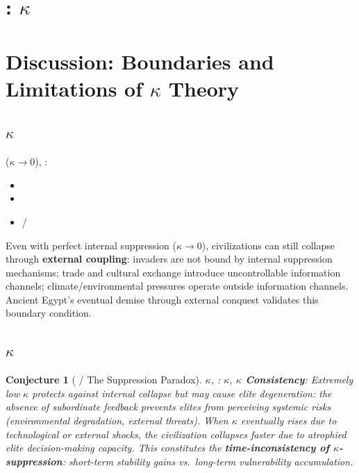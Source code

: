 \documentclass[11pt,a4paper]{article}
\newtheorem{conjecture}[theorem]{Conjecture}
\theoremstyle{definition}
\newcommand{\coupling}{\kappa}
\begin{document}
\section{: $\coupling$}
\section{Discussion: Boundaries and Limitations of $\coupling$ Theory}
\subsection{$\coupling$}
($\coupling \to 0$), : 
\begin{itemize}
 \item 
 \item 
 \item /
\end{itemize}
Even with perfect internal suppression ($\coupling \to 0$), civilizations can still
collapse through \textbf{external coupling}: invaders are not bound by internal suppression
mechanisms; trade and cultural exchange introduce uncontrollable information channels;
climate/environmental pressures operate outside information channels. Ancient Egypt's
eventual demise through external conquest validates this boundary condition.
\subsection{$\coupling$}
\begin{conjecture}[ / The Suppression Paradox]
\label{conj:paradox}
 $\coupling$, : 
 $\coupling$, 
 \textbf{$\coupling$ Consistency}: 
Extremely low $\coupling$ protects against internal collapse but may cause elite
degeneration: the absence of subordinate feedback prevents elites from perceiving
systemic risks (environmental degradation, external threats). When $\coupling$
eventually rises due to technological or external shocks, the civilization collapses
faster due to atrophied elite decision-making capacity. This constitutes the
\textbf{time-inconsistency of $\coupling$-suppression}: short-term stability gains
vs.\ long-term vulnerability accumulation.
\end{conjecture}
\end{document}
